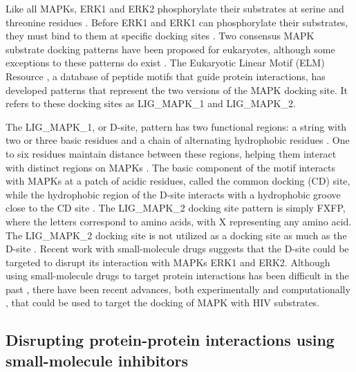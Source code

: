 
Like all MAPKs, ERK1 and ERK2 phosphorylate their substrates at serine
and threonine residues \cite{sugden1997regulation}. Before ERK1 and
ERK1 can phosphorylate their substrates, they must bind to them at
specific docking sites \cite{bardwell09}. Two consensus MAPK substrate
docking patterns have been proposed for eukaryotes, although some
exceptions to these patterns do exist
\cite{puntervoll03,bardwell09}. The Eukaryotic Linear Motif (ELM)
Resource \cite{puntervoll03}, a database of peptide motifs that guide
protein interactions, has developed patterns that represent the two
versions of the MAPK docking site. It refers to these docking sites as
LIG\_MAPK\_1 and LIG\_MAPK\_2.

The LIG\_MAPK\_1, or D-site, pattern has two functional regions: a
string with two or three basic residues and a chain of alternating
hydrophobic residues \cite{bardwell09}. One to six residues maintain
distance between these regions, helping them interact with distinct
regions on MAPKs \cite{bardwell06}. The basic component of the motif
interacts with MAPKs at a patch of acidic residues, called the common
docking (CD) site, while the hydrophobic region of the D-site
interacts with a hydrophobic groove close to the CD site
\cite{liu06}. The LIG\_MAPK\_2 docking site pattern is simply FXFP,
where the letters correspond to amino acids, with X representing any
amino acid. The LIG\_MAPK\_2 docking site is not utilized as a docking
site as much as the D-site \cite{puntervoll03}. Recent work with
small-molecule drugs suggests that the D-site could be targeted to
disrupt its interaction with MAPKs ERK1 and ERK2. Although using
small-molecule drugs to target protein interactions has been difficult
in the past \cite{arkin2004small}, there have been recent advances,
both experimentally \cite{remenyi06} and computationally
\cite{parthasarathi2008approved}, that could be used to target the
docking of MAPK with HIV substrates.

\subsection{Disrupting protein-protein interactions using small-molecule inhibitors}


